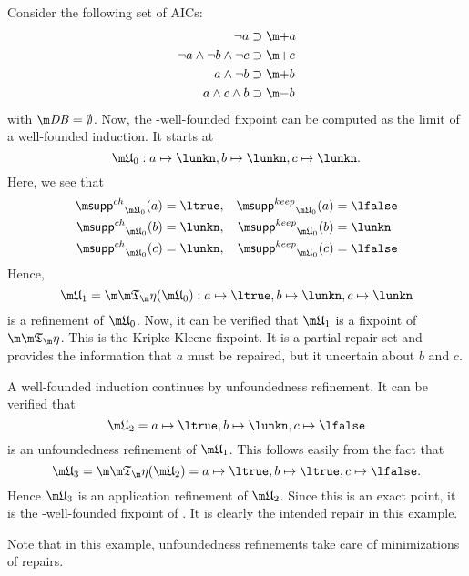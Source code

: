 \begin{example}
 Consider the following set \aics of AICs:
\begin{align*}
 \lnot a &\aicrule \add a \\ 
 \lnot a \land \lnot b \land \lnot c &\aicrule \add c\\
 a \land \lnot b &\aicrule \add b \\
 a \land c \land b &\aicrule \remove b
\end{align*} with $\db = \emptyset$.
Now, the \Ap-well-founded fixpoint can be computed as the limit of a well-founded induction. It starts at
\[\UUU_0: a\mapsto \lunkn, b\mapsto \lunkn, c\mapsto\lunkn.\]
Here, we see that 
\begin{align*}
 \suppin_{\UUU_0}(a) &= \ltrue, & \suppout_{\UUU_0}(a) &=\lfalse \\
 \suppin_{\UUU_0}(b) &= \lunkn, & \suppout_{\UUU_0}(b) &=\lunkn \\
 \suppin_{\UUU_0}(c) &= \lunkn, & \suppout_{\UUU_0}(c) &=\lfalse 
\end{align*}
Hence, 
\[\UUU_1 = \Ap(\UUU_0): a\mapsto \ltrue, b\mapsto \lunkn, c\mapsto\lunkn\]
is a refinement of $\UUU_0$. 
Now, it can be verified that $\UUU_1$ is a fixpoint of $\Ap$. This is the Kripke-Kleene fixpoint. It is a partial repair set and provides the information that $a$ must be repaired, but it uncertain about $b$ and $c$. 

A well-founded induction continues by unfoundedness refinement. 
It can be verified that 
\[\UUU_2 = a\mapsto \ltrue, b\mapsto \lunkn, c\mapsto\lfalse\]
is an unfoundedness refinement of $\UUU_1$.
This follows easily from the fact that 
\[\UUU_3 = \Ap(\UUU_2)= a\mapsto \ltrue, b\mapsto \ltrue, c\mapsto\lfalse.\]
Hence $\UUU_3$ is an application refinement of $\UUU_2$. Since this is an exact point, it is the \Ap-well-founded fixpoint of \Op. It is clearly the intended repair in this example.

Note that in this example, unfoundedness refinements take care of minimizations of repairs.  
\end{example}




